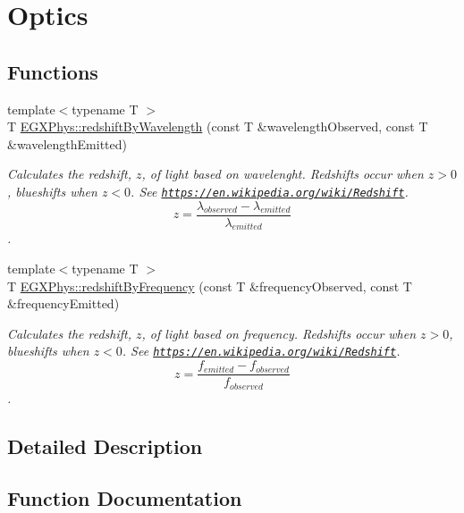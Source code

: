 \hypertarget{group___optics}{}\section{Optics}
\label{group___optics}
\subsection*{Functions}
\begin{DoxyCompactItemize}
\item 
{\footnotesize template$<$typename T $>$ }\\T \hyperlink{group___optics_ga29300a13e34da35332ca2d447b5ce82d}{E\+G\+X\+Phys\+::redshift\+By\+Wavelength} (const T \&wavelength\+Observed, const T \&wavelength\+Emitted)
\begin{DoxyCompactList}\small\item\em Calculates the redshift, $z$, of light based on wavelenght. Redshifts occur when $z > 0$, blueshifts when $z < 0$. See \href{https://en.wikipedia.org/wiki/Redshift}{\tt https\+://en.\+wikipedia.\+org/wiki/\+Redshift}. \[z=\frac{\lambda_{observed}-\lambda_{emitted}}{\lambda_{emitted}}\]. \end{DoxyCompactList}\item 
{\footnotesize template$<$typename T $>$ }\\T \hyperlink{group___optics_gacc6d3b2922061214d64b89a4b8e3967a}{E\+G\+X\+Phys\+::redshift\+By\+Frequency} (const T \&frequency\+Observed, const T \&frequency\+Emitted)
\begin{DoxyCompactList}\small\item\em Calculates the redshift, $z$, of light based on frequency. Redshifts occur when $z > 0$, blueshifts when $z < 0$. See \href{https://en.wikipedia.org/wiki/Redshift}{\tt https\+://en.\+wikipedia.\+org/wiki/\+Redshift}. \[z=\frac{f_{emitted}-f_{observed}}{f_{observed}}\]. \end{DoxyCompactList}\end{DoxyCompactItemize}


\subsection{Detailed Description}


\subsection{Function Documentation}
\mbox{\label{group___optics_gacc6d3b2922061214d64b89a4b8e3967a}} 
